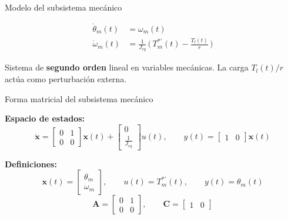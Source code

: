 \documentclass[aspectratio=169,t]{beamer}
\begin{document}
\begin{frame}{Modelo del subsistema mecánico}
\vspace{8mm}

\begin{align*}
\dot\theta_m(t) &= \omega_m(t) \\[6pt]
\dot \omega_m(t) &= \frac{1}{J_{eq}}\,\Big(\,T_m^{*\prime}(t) - \frac{T_l(t)}{r}\,\Big)
\end{align*}

\vspace{6mm}
{\small Sistema de \textbf{segundo orden} lineal en variables mecánicas. La carga $T_l(t)/r$ actúa como perturbación externa.}
\end{frame}

\begin{frame}{Forma matricial del subsistema mecánico}
\vspace{3mm}

\textbf{Espacio de estados:}
\begin{equation*}
\dot{\bm{x}} =
\begin{bmatrix} 0 & 1 \\ 0 & 0 \end{bmatrix} \bm{x}(t) +
\begin{bmatrix} 0 \\ \tfrac{1}{J_{eq}} \end{bmatrix} u(t),
\qquad
y(t) = \begin{bmatrix} 1 & 0 \end{bmatrix} \bm{x}(t)
\end{equation*}

\textbf{Definiciones:}
\begin{equation*}
\bm{x}(t)=\begin{bmatrix} \theta_m \\ \omega_m \end{bmatrix},
\qquad
u(t)=T_m^{*\prime}(t),
\qquad
y(t)=\theta_m(t)
\end{equation*}
\begin{equation*}
\bm{A}=\begin{bmatrix} 0 & 1\\ 0 & 0 \end{bmatrix},
\qquad
\bm{C}=\begin{bmatrix} 1 & 0 \end{bmatrix}
\end{equation*}
\end{frame}
\end{document}
